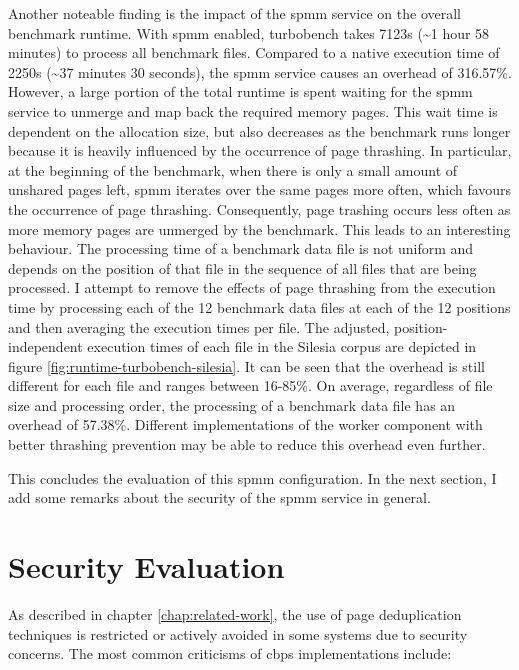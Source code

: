 Another noteable finding is the impact of the \ac{spmm} service on the overall benchmark runtime.
With \ac{spmm} enabled, turbobench takes 7123s (\textasciitilde{}1 hour 58 minutes) to process all benchmark files.
Compared to a native execution time of 2250s (\textasciitilde{}37 minutes 30 seconds), the \ac{spmm} service causes an overhead of 316.57\%.
However, a large portion of the total runtime is spent waiting for the \ac{spmm} service to unmerge and map back the required memory pages.
This wait time is dependent on the allocation size, but also decreases as the benchmark runs longer because it is heavily influenced by the occurrence of page thrashing.
In particular, at the beginning of the benchmark, when there is only a small amount of unshared pages left, \ac{spmm} iterates over the same pages more often, which favours the occurrence of page thrashing.
Consequently, page trashing occurs less often as more memory pages are unmerged by the benchmark.
This leads to an interesting behaviour.
The processing time of a benchmark data file is not uniform and depends on the position of that file in the sequence of all files that are being processed.
I attempt to remove the effects of page thrashing from the execution time by processing each of the 12 benchmark data files at each of the 12 positions and then averaging the execution times per file.
The adjusted, position-independent execution times of each file in the Silesia corpus are depicted in figure \ref{fig:runtime-turbobench-silesia}.
It can be seen that the overhead is still different for each file and ranges between 16-85\%.
On average, regardless of file size and processing order, the processing of a benchmark data file has an overhead of 57.38\%.
Different implementations of the worker component with better thrashing prevention may be able to reduce this overhead even further.

This concludes the evaluation of this \ac{spmm} configuration.
In the next section, I add some remarks about the security of the \ac{spmm} service in general.

\section{Security Evaluation}
\label{sec:security-evaluation}

As described in chapter \ref{chap:related-work}, the use of page deduplication techniques is restricted or actively avoided in some systems due to security concerns.
The most common criticisms of \ac{cbps} implementations include:

